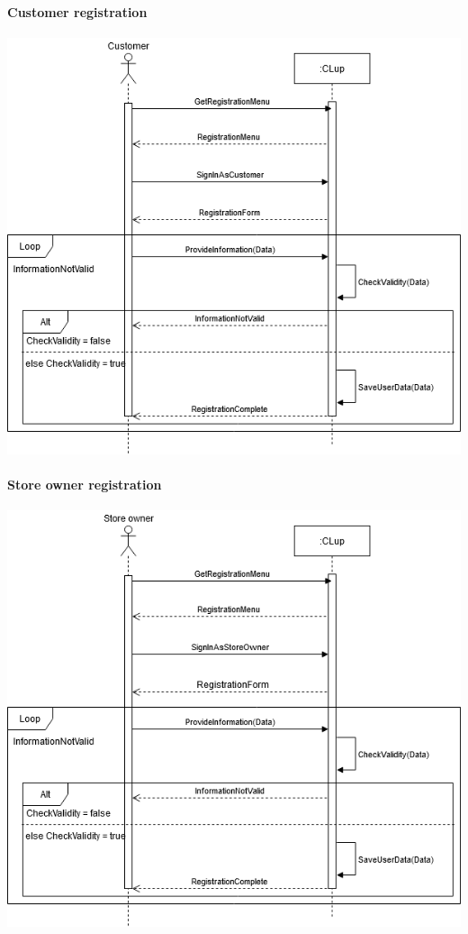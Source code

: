 \paragraph{Customer registration}
\begin{flushleft}
	\includegraphics[scale=0.5]{Images/UseCase1Diagram.png}
\end{flushleft}

\paragraph{Store owner registration}
\begin{flushleft}
	\includegraphics[scale=0.5]{Images/UseCase2Diagram.png}
\end{flushleft}

